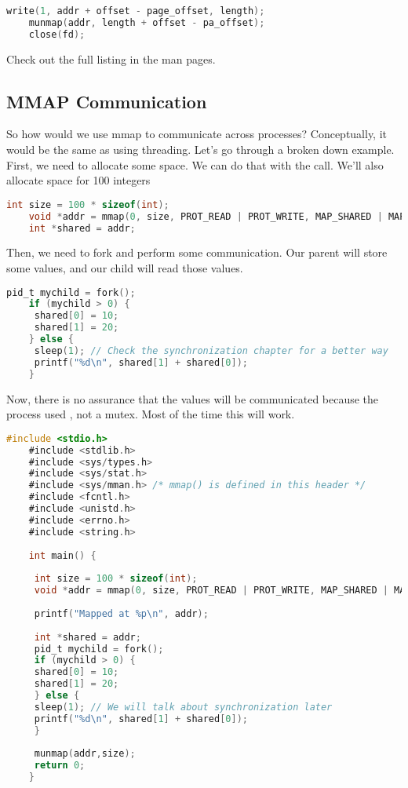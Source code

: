 	\begin{lstlisting}[language=C]
	write(1, addr + offset - page_offset, length);
	munmap(addr, length + offset - pa_offset);
	close(fd);
	\end{lstlisting}
	 
	Check out the full listing in the man pages.
	 
	\subsection{MMAP Communication}
	 
	So how would we use mmap to communicate across processes?
	Conceptually, it would be the same as using threading.
	Let's go through a broken down example.
	First, we need to allocate some space.
	We can do that with the  call.
	We'll also allocate space for 100 integers
	 
	\begin{lstlisting}[language=C]
	int size = 100 * sizeof(int);
	void *addr = mmap(0, size, PROT_READ | PROT_WRITE, MAP_SHARED | MAP_ANONYMOUS, -1, 0);
	int *shared = addr;
	\end{lstlisting}
	 
	Then, we need to fork and perform some communication.
	Our parent will store some values, and our child will read those values.
	 
	\begin{lstlisting}[language=C]
	pid_t mychild = fork();
	if (mychild > 0) {
	 shared[0] = 10;
	 shared[1] = 20;
	} else {
	 sleep(1); // Check the synchronization chapter for a better way
	 printf("%d\n", shared[1] + shared[0]);
	}
	\end{lstlisting}
	 
	Now, there is no assurance that the values will be communicated because the process used , not a mutex.
	Most of the time this will work.
	 
	\begin{lstlisting}[language=C]
	#include <stdio.h>
	#include <stdlib.h>
	#include <sys/types.h>
	#include <sys/stat.h>
	#include <sys/mman.h> /* mmap() is defined in this header */
	#include <fcntl.h>
	#include <unistd.h>
	#include <errno.h>
	#include <string.h>
	 
	int main() {
	 
	 int size = 100 * sizeof(int);
	 void *addr = mmap(0, size, PROT_READ | PROT_WRITE, MAP_SHARED | MAP_ANONYMOUS, -1, 0);
	 
	 printf("Mapped at %p\n", addr);
	 
	 int *shared = addr;
	 pid_t mychild = fork();
	 if (mychild > 0) {
	 shared[0] = 10;
	 shared[1] = 20;
	 } else {
	 sleep(1); // We will talk about synchronization later
	 printf("%d\n", shared[1] + shared[0]);
	 }
	 
	 munmap(addr,size);
	 return 0;
	}
	\end{lstlisting}
	 
